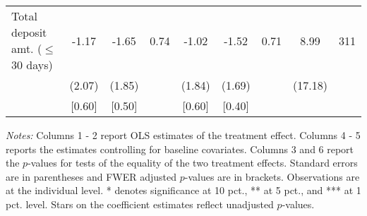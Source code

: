\begin{table}[h]
{\begin{threeparttable}
\begin{tabular}{l*{8}{c}}
Total deposit amt. ($\leq$ 30 days)&    -1.17&    -1.65&     0.74&    -1.02&    -1.52&     0.71&     8.99&      311\\
          &   (2.07)&   (1.85)&         &   (1.84)&   (1.69)&         &  (17.18)&         \\
          &   [0.60]&   [0.50]&         &   [0.60]&   [0.40]&         &         &         \\
\bottomrule \end{tabular} \begin{tablenotes}[flushleft] \footnotesize \item \emph{Notes:} Columns 1 - 2 report OLS estimates of the treatment effect. Columns 4 - 5 reports the estimates controlling for baseline covariates. Columns 3 and 6 report the \(p\)-values for tests of the equality of the two treatment effects. Standard errors are in parentheses and FWER adjusted \(p\)-values are in brackets. Observations are at the individual level. * denotes significance at 10 pct., ** at 5 pct., and *** at 1 pct. level. Stars on the coefficient estimates reflect unadjusted \(p\)-values. \end{tablenotes} \end{threeparttable} } \end{table}

